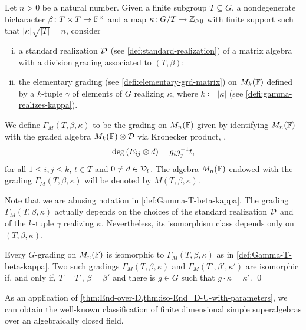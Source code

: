 \begin{defi}\label{def:Gamma-T-beta-kappa}
    Let $n > 0$ be a natural number. 
    Given a finite subgroup $T \subseteq G$, a nondegenerate bicharacter $\beta\colon T\times T \to \mathbb{F}^\times$ and a map $\kappa\colon G/T \to \mathbb{Z}_{\geq 0}$ with finite support such that $|\kappa| \sqrt{|T|} = n$, consider
    \begin{enumerate}[(i)]
        \item a standard realization $\mathcal{D}$ (see \cref{def:standard-realization}) of a matrix algebra with a division grading associated to $(T,\beta)$;
        \item the elementary grading (see \cref{defi:elementary-grd-matrix}) on $M_{k}(\mathbb{F})$ defined by a $k$-tuple $\gamma$ of elements of $G$ realizing $\kappa$, where $k \coloneqq |\kappa|$ (see \cref{defi:gamma-realizes-kappa}).  
    \end{enumerate}
    We define $\Gamma_M (T, \beta, \kappa)$ to be the grading on $M_n(\mathbb{F})$ given by identifying $M_n(\mathbb{F})$ with the graded algebra $M_k(\mathbb{F}) \otimes \mathcal{D}$ via Kronecker product, \ie,
    \[
        \deg \left( E_{ij} \otimes d \right) = g_ig_j^{-1} t,
    \] 
    for all $1\leq i, j \leq k$, $t\in T$ and $0 \neq d \in \mathcal{D}_t$. 
    The algebra $M_n(\mathbb{F})$ endowed with the grading $\Gamma_M (T, \beta, \kappa)$ will be denoted by $M(T, \beta, \kappa)$.
\end{defi}

Note that we are abusing notation in \cref{def:Gamma-T-beta-kappa}. 
The grading $\Gamma_M (T, \beta, \kappa)$ actually depends on the choices of the standard realization $\mathcal{D}$ and of the $k$-tuple $\gamma$ realizing $\kappa$. 
Nevertheless, its isomorphism class depends only on $(T, \beta, \kappa)$. 

\begin{cor}\label{cor:grds-matrix-alg}
    Every $G$-grading on $M_n(\mathbb{F})$ is isomorphic to $\Gamma_M (T, \beta, \kappa)$ as in \cref{def:Gamma-T-beta-kappa}. 
    Two such gradings $\Gamma_M (T, \beta, \kappa)$ and $\Gamma_M (T', \beta', \kappa')$ are isomorphic if, and only if, $T = T'$, $\beta = \beta'$ and there is $g\in G$ such that  $g \cdot \kappa = \kappa'$. \qed
\end{cor}

As an application of \cref{thm:End-over-D,thm:iso-End_D-U-with-parameters}, we can obtain the well-known classification of finite dimensional simple superalgebras over an algebraically closed field. 

